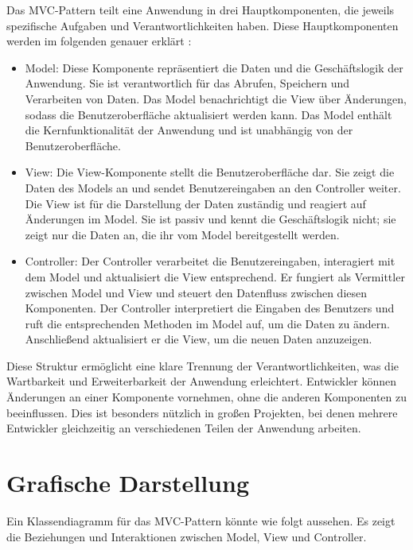 Das \ac{MVC}-Pattern teilt eine Anwendung in drei Hauptkomponenten, die jeweils spezifische Aufgaben und Verantwortlichkeiten haben. Diese Hauptkomponenten werden im folgenden genauer erklärt \cite{cui2009phpmvc}:
\begin{itemize}

\item Model: Diese Komponente repräsentiert die Daten und die Geschäftslogik der Anwendung. Sie ist verantwortlich für das Abrufen, Speichern und Verarbeiten von Daten. Das Model benachrichtigt die View über Änderungen, sodass die Benutzeroberfläche aktualisiert werden kann. Das Model enthält die Kernfunktionalität der Anwendung und ist unabhängig von der Benutzeroberfläche.

\item View: Die View-Komponente stellt die Benutzeroberfläche dar. Sie zeigt die Daten des Models an und sendet Benutzereingaben an den Controller weiter. Die View ist für die Darstellung der Daten zuständig und reagiert auf Änderungen im Model. Sie ist passiv und kennt die Geschäftslogik nicht; sie zeigt nur die Daten an, die ihr vom Model bereitgestellt werden.
\newpage
\item Controller: Der Controller verarbeitet die Benutzereingaben, interagiert mit dem Model und aktualisiert die View entsprechend. Er fungiert als Vermittler zwischen Model und View und steuert den Datenfluss zwischen diesen Komponenten. Der Controller interpretiert die Eingaben des Benutzers und ruft die entsprechenden Methoden im Model auf, um die Daten zu ändern. Anschließend aktualisiert er die View, um die neuen Daten anzuzeigen.

\end{itemize}
Diese Struktur ermöglicht eine klare Trennung der Verantwortlichkeiten, was die Wartbarkeit und Erweiterbarkeit der Anwendung erleichtert. Entwickler können Änderungen an einer Komponente vornehmen, ohne die anderen Komponenten zu beeinflussen. Dies ist besonders nützlich in großen Projekten, bei denen mehrere Entwickler gleichzeitig an verschiedenen Teilen der Anwendung arbeiten.

\section{Grafische Darstellung}
\label{sec:klassendiagramm}

Ein Klassendiagramm für das \ac{MVC}-Pattern könnte wie folgt aussehen. Es zeigt die Beziehungen und Interaktionen zwischen Model, View und Controller.

